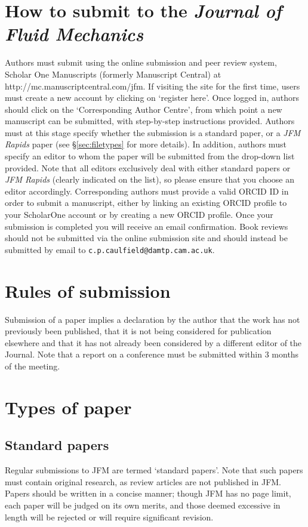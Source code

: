 \documentclass{jfm}
\begin{document}
\section{How to submit to the \textbf{\textit{Journal of Fluid Mechanics}}}
Authors must submit using the online submission and peer review system, Scholar One Manuscripts (formerly Manuscript Central) at http://mc.manuscriptcentral.com/jfm. If visiting the site for the first time, users must create a new account by clicking on `register here'. Once logged in, authors should click on the `Corresponding Author Centre', from which point a new manuscript can be submitted, with step-by-step instructions provided. Authors must at this stage specify whether the submission is a standard paper, or a {\it JFM Rapids} paper (see \S\ref{sec:filetypes} for more details). In addition, authors must specify an editor to whom the paper will be submitted from the drop-down list provided. Note that all editors exclusively deal with either standard papers or {\it JFM Rapids} (clearly indicated on the list), so please ensure that you choose an editor accordingly. Corresponding authors must provide a valid ORCID ID in order to submit a manuscript, either by linking an existing ORCID profile to your ScholarOne account or by creating a new ORCID profile. Once your submission is completed you will receive an email confirmation.  Book reviews should not be submitted via the online submission site and should instead be submitted by email to \verb|c.p.caulfield@damtp.cam.ac.uk|.
 
\section{Rules of submission}\label{sec:rules_submission}
Submission of a paper implies a declaration by the author that the work has not previously been published, that it is not being considered for publication elsewhere and that it has not already been considered by a different editor of the Journal. Note that a report on a conference must be submitted within 3 months of the meeting.

\section{Types of paper}\label{sec:types_paper}
\subsection{Standard papers}
Regular submissions to JFM are termed `standard papers'. Note that such papers must contain original research, as review articles are not published in JFM. Papers should be written in a concise manner; though JFM has no page limit, each paper will be judged on its own merits, and those deemed excessive in length will be rejected or will require significant revision.  
\end{document}
